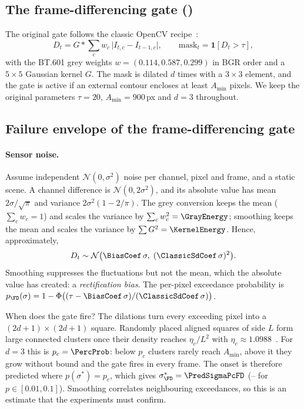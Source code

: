 \subsection{The frame-differencing gate (\FD)}\label{sec:fd}
The original gate follows the classic OpenCV recipe~\cite{bradski2000opencv}:
\begin{equation}\label{eq:fd}
D_t=G*\sum_{c}w_c\,\bigl|I_{t,c}-I_{t-1,c}\bigr|,\qquad \text{mask}_t=\mathbf{1}[D_t>\tau],
\end{equation}
with the BT.601 grey weights $w=(0.114,0.587,0.299)$ in BGR order and a $5\times5$ Gaussian kernel $G$. The mask is dilated $d$ times with a $3\times3$ element, and the gate is active if an external contour encloses at least $A_{\min}$ pixels. We keep the original parameters $\tau=20$, $A_{\min}=900$\,px and $d=3$ throughout.

\subsection{Failure envelope of the frame-differencing gate}\label{sec:envelope}

\paragraph{Sensor noise.} Assume independent $\mathcal{N}(0,\sigma^2)$ noise per channel, pixel and frame, and a static scene. A channel difference is $\mathcal{N}(0,2\sigma^2)$, and its absolute value has mean $2\sigma/\sqrt{\pi}$ and variance $2\sigma^2(1-2/\pi)$. The grey conversion keeps the mean ($\sum_c w_c=1$) and scales the variance by $\sum_c w_c^2=\GrayEnergy$; smoothing keeps the mean and scales the variance by $\sum G^2=\KernelEnergy$. Hence, approximately,
\begin{equation}\label{eq:bias}
D_t\sim\mathcal{N}\bigl(\BiasCoef\,\sigma,\;(\ClassicSdCoef\,\sigma)^2\bigr).
\end{equation}
Smoothing suppresses the fluctuations but not the mean, which the absolute value has created: a \emph{rectification bias}. The per-pixel exceedance probability is $p_{\FD}(\sigma)=1-\Phi\bigl((\tau-\BiasCoef\,\sigma)/(\ClassicSdCoef\,\sigma)\bigr)$.

When does the gate fire? The dilations turn every exceeding pixel into a $(2d+1)\times(2d+1)$ square. Randomly placed aligned squares of side $L$ form large connected clusters once their density reaches $\eta_c/L^2$ with $\eta_c\approx1.0988$~\cite{mertens2012continuum}. For $d=3$ this is $p_c=\PercProb$: below $p_c$ clusters rarely reach $A_{\min}$, above it they grow without bound and the gate fires in every frame. The onset is therefore predicted where $p(\sigma^*)=p_c$, which gives $\sigma^*_{\FD}=\PredSigmaPcFD$ (\PredSigmaLoFD--\PredSigmaHiFD{} for $p\in[0.01,0.1]$). Smoothing correlates neighbouring exceedances, so this is an estimate that the experiments must confirm.

